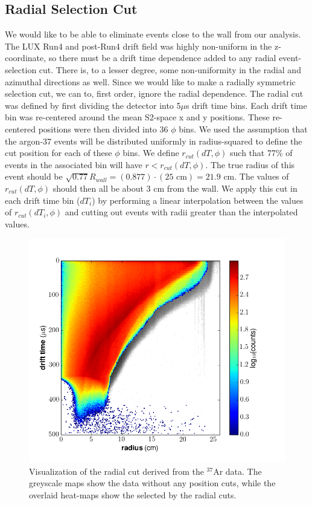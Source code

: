 \subsection{Radial Selection Cut}
We would like to be able to eliminate events close to the wall from our analysis. The LUX Run4 and post-Run4 drift field was highly non-uniform in the z-coordinate, so there must be a drift time dependence added to any radial event-selection cut. There is, to a lesser degree, some non-uniformity in the radial and azimuthal directions as well. Since we would like to make a radially symmetric selection cut, we can to, first order, ignore the radial dependence. The radial cut was defined by first dividing the detector into 5$\mu$s drift time bins. Each drift time bin was re-centered around the mean S2-space x and y positions. These re-centered positions were then divided into 36 $\phi$ bins. We used the assumption that the argon-37 events will be distributed uniformly in radius-squared to define the cut position for each of these $\phi$ bins. We define $r_{cut}(dT,\phi)$ such that 77\% of events in the associated bin will have $r<r_{cut}(dT,\phi)$. The true radius of this event should be $\sqrt{0.77}R_{wall}=(0.877)\cdot (25 \text{\ cm})=21.9 \text{\ cm}$. The values of $r_{cut}(dT,\phi)$ should then all be about 3 cm from the wall. We apply this cut in each drift time bin ($dT_i$) by performing a linear interpolation between the values of $r_{cut}(dT_i,\phi)$ and cutting out events with radii greater than the interpolated values.
\begin{figure}[h!]
\centering
  \includegraphics[width=\textwidth]{Figures/xycut_dt.png}
\caption{Visualization of the radial cut derived from the $^{37}$Ar data. The greyscale maps show the data without any position cuts, while the overlaid heat-maps show the selected by the radial cuts. }
\label{fig:xycut_dt}
\end{figure}
